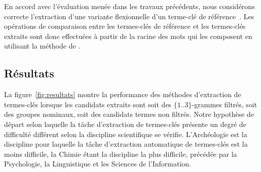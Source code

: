     En accord avec l'évaluation menée dans les travaux précédents, nous
    considérons correcte l'extraction d'une variante flexionnelle d'un terme-clé
    de référence~\cite{kim2010semeval}. Les opérations de comparaison entre les
    termes-clés de référence et les termes-clés extraits sont donc effectuées à
    partir de la racine des mots qui les composent en utilisant la méthode de
    .

  \subsection{Résultats}
  \label{subsec:resultats}
    La figure~\ref{fig:resultats} montre la performance des méthodes
    d'extraction de termes-clés lorsque les candidats extraits sont soit des
    $\{1..3\}$-grammes filtrés, soit des groupes nominaux, soit des candidats
    termes non filtrés.
    Notre hypothèse de départ selon laquelle la tâche d'extraction de
    termes-clés présente un degré de difficulté différent selon la discipline
    scientifique se vérifie.
    L'Archéologie
    est la discipline pour laquelle la tâche d'extraction automatique de
    termes-clés est la moins difficile, la Chimie étant la discipline la plus
    difficile, précédée par la Psychologie, la Linguistique et les Sciences de
    l'Information.

